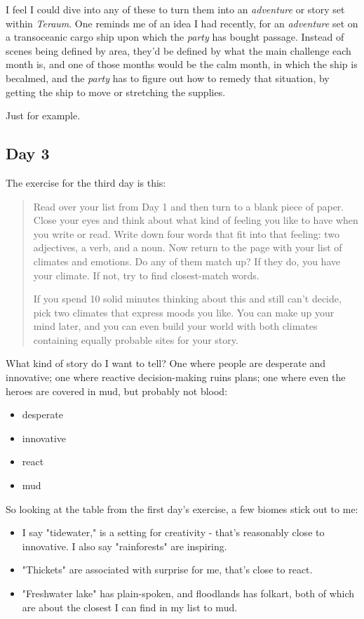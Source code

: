 \documentclass[11pt]{article}
\begin{document}
I feel I could dive into any of these to turn them into an \emph{adventure}
or story set within \emph{Teraum}. One reminds me of an idea I had
recently, for an \emph{adventure} set on a transoceanic cargo ship upon
which the \emph{party} has bought passage. Instead of scenes being defined
by area, they'd be defined by what the main challenge each month is,
and one of those months would be the calm month, in which the ship
is becalmed, and the \emph{party} has to figure out how to remedy that
situation, by getting the ship to move or stretching the supplies.

Just for example.
\subsection*{Day 3}
\label{sec:orged77828}
The exercise for the third day is this:

\begin{quote}
Read over your list from Day 1 and then turn to a blank piece of
paper. Close your eyes and think about what kind of feeling you like
to have when you write or read. Write down four words that fit into
that feeling: two adjectives, a verb, and a noun. Now return to the
page with your list of climates and emotions. Do any of them match up?
If they do, you have your climate. If not, try to find closest-match
words.

If you spend 10 solid minutes thinking about this and still can't
decide, pick two climates that express moods you like. You can make up
your mind later, and you can even build your world with both climates
containing equally probable sites for your story.
\end{quote}

What kind of story do I want to tell? One where people are desperate
and innovative; one where reactive decision-making ruins plans; one
where even the heroes are covered in mud, but probably not blood:

\begin{itemize}
\item desperate
\item innovative
\item react
\item mud
\end{itemize}

So looking at the table from the first day's exercise, a few biomes
stick out to me:

\begin{itemize}
\item I say "tidewater," is a setting for creativity - that's reasonably
close to innovative. I also say "rainforests" are inspiring.
\item "Thickets" are associated with surprise for me, that's close to
react.
\item "Freshwater lake" has plain-spoken, and floodlands has folkart, both
of which are about the closest I can find in my list to mud.
\end{itemize}
\end{document}
